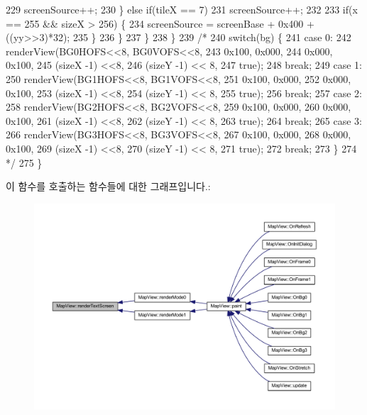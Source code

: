 \begin{DoxyCode}
229             screenSource++;
230         \} \textcolor{keywordflow}{else} \textcolor{keywordflow}{if}(tileX == 7)
231           screenSource++;
232 
233         \textcolor{keywordflow}{if}(x == 255 && sizeX > 256) \{
234           screenSource = screenBase + 0x400 + ((yy>>3)*32);
235         \}        
236       \}
237     \}
238   \}
239   \textcolor{comment}{/*}
240 \textcolor{comment}{    switch(bg) \{}
241 \textcolor{comment}{    case 0:}
242 \textcolor{comment}{    renderView(BG0HOFS<<8, BG0VOFS<<8,}
243 \textcolor{comment}{    0x100, 0x000,}
244 \textcolor{comment}{    0x000, 0x100,}
245 \textcolor{comment}{    (sizeX -1) <<8,}
246 \textcolor{comment}{    (sizeY -1) << 8,}
247 \textcolor{comment}{    true);}
248 \textcolor{comment}{    break;}
249 \textcolor{comment}{    case 1:}
250 \textcolor{comment}{    renderView(BG1HOFS<<8, BG1VOFS<<8,}
251 \textcolor{comment}{    0x100, 0x000,}
252 \textcolor{comment}{    0x000, 0x100,}
253 \textcolor{comment}{    (sizeX -1) <<8,}
254 \textcolor{comment}{    (sizeY -1) << 8,}
255 \textcolor{comment}{    true);}
256 \textcolor{comment}{    break;}
257 \textcolor{comment}{    case 2:}
258 \textcolor{comment}{    renderView(BG2HOFS<<8, BG2VOFS<<8,}
259 \textcolor{comment}{    0x100, 0x000,}
260 \textcolor{comment}{    0x000, 0x100,}
261 \textcolor{comment}{    (sizeX -1) <<8,}
262 \textcolor{comment}{    (sizeY -1) << 8,}
263 \textcolor{comment}{    true);}
264 \textcolor{comment}{    break;}
265 \textcolor{comment}{    case 3:}
266 \textcolor{comment}{    renderView(BG3HOFS<<8, BG3VOFS<<8,}
267 \textcolor{comment}{    0x100, 0x000,}
268 \textcolor{comment}{    0x000, 0x100,}
269 \textcolor{comment}{    (sizeX -1) <<8,}
270 \textcolor{comment}{    (sizeY -1) << 8,}
271 \textcolor{comment}{    true);}
272 \textcolor{comment}{    break;}
273 \textcolor{comment}{    \}}
274 \textcolor{comment}{  */}
275 \}
\end{DoxyCode}
이 함수를 호출하는 함수들에 대한 그래프입니다.\+:
\nopagebreak
\begin{figure}[H]
\begin{center}
\leavevmode
\includegraphics[width=350pt]{class_map_view_acff08c9c182f791799a27592ea7aafff_icgraph}
\end{center}
\end{figure}
\mbox{\label{class_map_view_a792d85841dc88e63ab7f31ed6de066d7}} 
